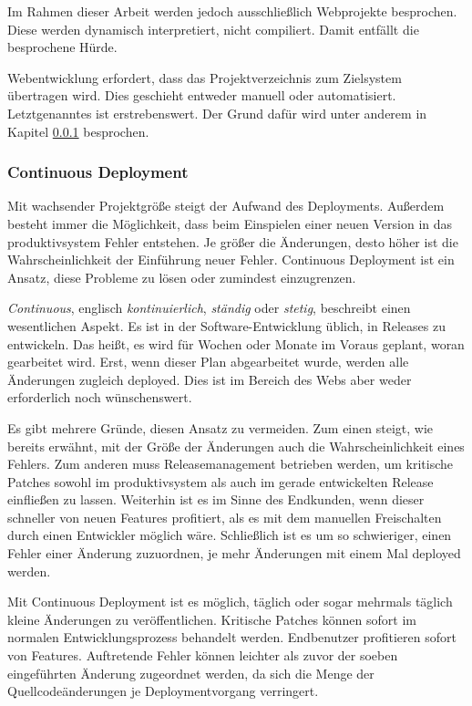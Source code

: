 Im Rahmen dieser Arbeit werden jedoch ausschließlich Webprojekte besprochen. Diese werden dynamisch interpretiert, nicht compiliert. Damit entfällt die besprochene Hürde.

Webentwicklung erfordert, dass das Projektverzeichnis zum Zielsystem übertragen wird. Dies geschieht entweder manuell oder automatisiert. Letztgenanntes ist erstrebenswert. Der Grund dafür wird unter anderem in Kapitel \ref{ssub:continuous_deployment} besprochen.


\subsubsection{Continuous Deployment} %
\label{ssub:continuous_deployment}

Mit wachsender Projektgröße steigt der Aufwand des Deployments. Außerdem besteht immer die Möglichkeit, dass beim Einspielen einer neuen Version in das \gls{produktivsystem} Fehler entstehen. Je größer die Änderungen, desto höher ist die Wahrscheinlichkeit der Einführung neuer Fehler. Continuous Deployment ist ein Ansatz, diese Probleme zu lösen oder zumindest einzugrenzen.

\emph{Continuous}, englisch \emph{kontinuierlich}, \emph{ständig} oder \emph{stetig}, beschreibt einen wesentlichen Aspekt. Es ist in der Software-Entwicklung üblich, in Releases zu entwickeln. Das heißt, es wird für Wochen oder Monate im Voraus geplant, woran gearbeitet wird. Erst, wenn dieser Plan abgearbeitet wurde, werden alle Änderungen zugleich deployed. Dies ist im Bereich des Webs aber weder erforderlich noch wünschenswert.

Es gibt mehrere Gründe, diesen Ansatz zu vermeiden. Zum einen steigt, wie bereits erwähnt, mit der Größe der Änderungen auch die Wahrscheinlichkeit eines Fehlers. Zum anderen muss Releasemanagement betrieben werden, um kritische Patches sowohl im \gls{produktivsystem} als auch im gerade entwickelten Release einfließen zu lassen. Weiterhin ist es im Sinne des Endkunden, wenn dieser schneller von neuen Features profitiert, als es mit dem manuellen Freischalten durch einen Entwickler möglich wäre. Schließlich ist es um so schwieriger, einen Fehler einer Änderung zuzuordnen, je mehr Änderungen mit einem Mal deployed werden.

Mit Continuous Deployment ist es möglich, täglich oder sogar mehrmals täglich kleine Änderungen zu veröffentlichen. Kritische Patches können sofort im normalen Entwicklungsprozess behandelt werden. Endbenutzer profitieren sofort von Features. Auftretende Fehler können leichter als zuvor der soeben eingeführten Änderung zugeordnet werden, da sich die Menge der Quellcodeänderungen je Deploymentvorgang verringert.

